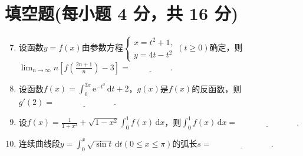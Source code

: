 \documentclass[../Main.tex]{subfiles}
\begin{document}
\section{填空题(每小题 4 分，共 16 分)}
\begin{enumerate}
    \setcounter{enumi}{6}
    \item 设函数$y=f(x)$由参数方程$\begin{cases}
                  x=t^{2}+1, \\
                  y=4t-t^{2}
              \end{cases}(t\geq0)$确定，则$\lim_{n\to\infty}n\left[f\left(\frac{2n+1}{n}\right
                  )-3\right]=\underline{\hspace{2cm}}$.

    \item 设函数$f(x)=\int_{0}^{3x}\mathrm{e}^{-t^2}\,\mathrm{d}t+2$，$g(x)$是$f
              (x)$的反函数，则$g'(2)=\underline{\hspace{3cm}}$.

    \item 设$f(x)=\frac{1}{1+x^{2}}+\sqrt{1-x^{2}}\int_{0}^{1} f(x)\,\mathrm{d}
              x$，则$\int_{0}^{1} f(x)\,\mathrm{d}x=\underline{\hspace{3cm}}$.

    \item 连续曲线段$y=\int_{0}^{x}\sqrt{\sin t}\,\mathrm{d}t(0\leq x\leq \pi)$的弧长$s
              =\underline{\hspace{3cm}}$.
\end{enumerate}
\end{document}
